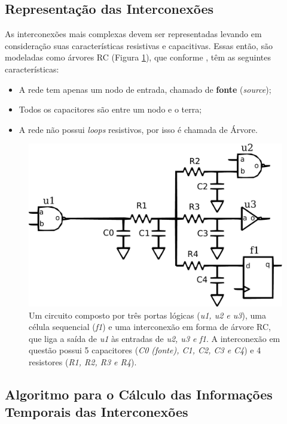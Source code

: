 \documentclass[
	12pt,				%
	openright,			%
	twoside,			%
	a4paper,			%
	english,			%
	french,				%
	spanish,			%
	brazil,				%
	]{abntex2}
\begin{document}
\subsection{Representação das Interconexões}
As interconexões mais complexas devem ser representadas levando em consideração suas características resistivas e capacitivas. Essas então, são modeladas como árvores RC (Figura \ref{fig:rc}), que conforme , têm as seguintes características: 

\begin{itemize}
\item A rede tem apenas um nodo de entrada, chamado de \textbf{fonte} (\textit{source});
\item Todos os capacitores são entre um nodo e o terra;
\item A rede não possui \textit{loops} resistivos, por isso é chamada de Árvore.
\end{itemize}

\begin{figure}[ht]
\begin{center}
\includegraphics[width=0.7 \linewidth]{img/rc.pdf} 
\caption{Um circuito composto por três portas lógicas (\textit{u1, u2 e u3}), uma célula sequencial (\textit{f1}) e uma interconexão em forma de árvore RC, que liga a saída de \textit{u1} às entradas de \textit{u2, u3 e f1}. A interconexão em questão possui 5 capacitores (\textit{C0 (fonte), C1, C2, C3 e C4}) e 4 resistores (\textit{R1, R2, R3 e R4}).}
\label{fig:rc}
\end{center}
\end{figure}

\subsection{Algoritmo para o Cálculo das Informações Temporais das Interconexões}
\end{document}
